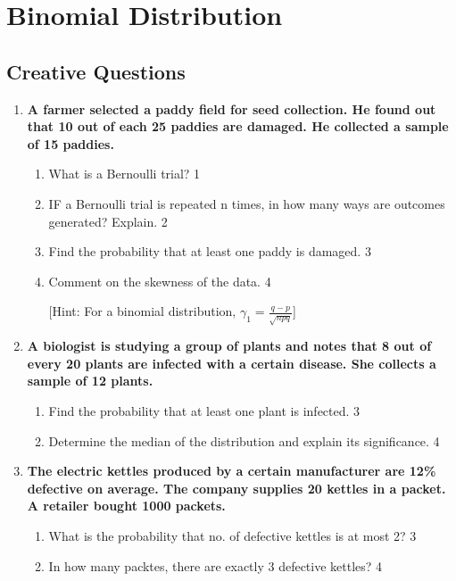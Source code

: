 \documentclass[a4paper,oneside, margin=1.4in]{book}
\begin{document}
\chapter{Binomial Distribution} 
\section{Creative Questions}
  \begin{enumerate}
  
     \item
	  \textbf{A farmer selected a paddy field for seed collection. He found out that 10 out of each 25 paddies are damaged. He collected a sample of 15 paddies.} 
  
  \begin{enumerate}
    \item
	What is a Bernoulli trial? \hfill 1
    \item
	IF a Bernoulli trial is repeated n times, in how many ways are outcomes 
	generated? Explain. \hfill 2
    \item  
	Find the probability that at least one paddy is damaged. \hfill 3
    \item
	Comment on the skewness of the data. \hfill 4 
	
		[Hint: For a binomial distribution, $\gamma_1 = \frac{q-p}{\sqrt{npq}}$]
  \end{enumerate}
  
  \item
	  \textbf{A biologist is studying a group of plants and notes that 8 out of every 20 plants are infected with a certain disease. She collects a sample of 12 plants.} 
  
  \begin{enumerate}
    \item  
	Find the probability that at least one plant is infected. \hfill 3
    \item
	Determine the median of the distribution and explain its significance. \hfill 4
  \end{enumerate}


 \item
	  \textbf{The electric kettles produced by a certain manufacturer are 12\% 
	  defective on average. The company supplies 20 kettles in a packet. A retailer
	  bought 1000 packets.} 
  
  \begin{enumerate}
    \item  
	What is the probability that no. of defective kettles is at most 2? \hfill 3
    \item
	In how many packtes, there are exactly 3 defective kettles? \hfill 4
  \end{enumerate}
  

\end{enumerate}
\end{document}
